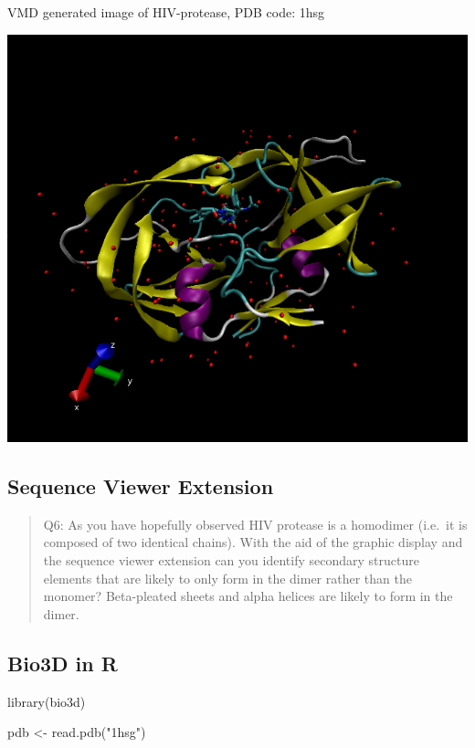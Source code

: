 \documentclass[
]{article}
\newenvironment{Shaded}{\begin{snugshade}}{\end{snugshade}}
\newcommand{\FunctionTok}[1]{\textcolor[rgb]{0.00,0.00,0.00}{#1}}
\newcommand{\NormalTok}[1]{#1}
\newcommand{\OtherTok}[1]{\textcolor[rgb]{0.56,0.35,0.01}{#1}}
\newcommand{\StringTok}[1]{\textcolor[rgb]{0.31,0.60,0.02}{#1}}
\begin{document}
VMD generated image of HIV-protease, PDB code: 1hsg

\includegraphics{hiv_image.png}

\hypertarget{sequence-viewer-extension}{%
\subsection{Sequence Viewer Extension}\label{sequence-viewer-extension}}

\begin{quote}
Q6: As you have hopefully observed HIV protease is a homodimer (i.e.~it
is composed of two identical chains). With the aid of the graphic
display and the sequence viewer extension can you identify secondary
structure elements that are likely to only form in the dimer rather than
the monomer? Beta-pleated sheets and alpha helices are likely to form in
the dimer.
\end{quote}

\hypertarget{bio3d-in-r}{%
\subsection{Bio3D in R}\label{bio3d-in-r}}

\begin{Shaded}
\begin{Highlighting}[]
\FunctionTok{library}\NormalTok{(bio3d)}

\NormalTok{pdb }\OtherTok{\textless{}{-}} \FunctionTok{read.pdb}\NormalTok{(}\StringTok{"1hsg"}\NormalTok{)}
\end{Highlighting}
\end{Shaded}
\end{document}
